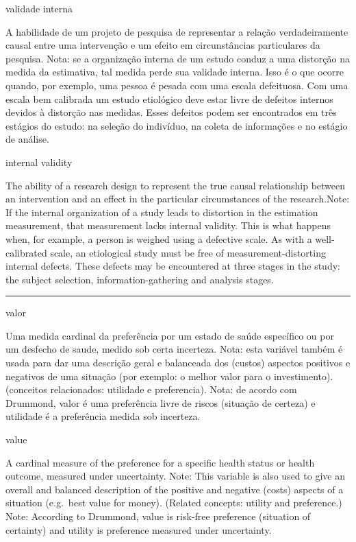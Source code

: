 \documentclass[
]{book}
\begin{document}
validade interna

A habilidade de um projeto de pesquisa de representar a relação verdadeiramente causal entre uma intervenção e um efeito em circunstâncias particulares da pesquisa. Nota: se a organização interna de um estudo conduz a uma distorção na medida da estimativa, tal medida perde sua validade interna. Isso é o que ocorre quando, por exemplo, uma pessoa é pesada com uma escala defeituosa. Com uma escala bem calibrada um estudo etiológico deve estar livre de defeitos internos devidos à distorção nas medidas. Esses defeitos podem ser encontrados em três estágios do estudo: na seleção do indivíduo, na coleta de informações e no estágio de análise.

internal validity

The ability of a research design to represent the true causal relationship between an intervention and an effect in the particular circumstances of the research.Note: If the internal organization of a study leads to distortion in the estimation measurement, that measurement lacks internal validity. This is what happens when, for example, a person is weighed using a defective scale. As with a well-calibrated scale, an etiological study must be free of measurement-distorting internal defects. These defects may be encountered at three stages in the study: the subject selection, information-gathering and analysis stages.

\begin{center}\rule{0.5\linewidth}{0.5pt}\end{center}

valor

Uma medida cardinal da preferência por um estado de saúde específico ou por um desfecho de saude, medido sob certa incerteza. Nota: esta variável também é usada para dar uma descrição geral e balanceada dos (custos) aspectos positivos e negativos de uma situação (por exemplo: o melhor valor para o investimento). (conceitos relacionados: utilidade e preferencia). Nota: de acordo com Drummond, valor é uma preferência livre de riscos (situação de certeza) e utilidade é a preferência medida sob incerteza.

value

A cardinal measure of the preference for a specific health status or health outcome, measured under uncertainty. Note: This variable is also used to give an overall and balanced description of the positive and negative (costs) aspects of a situation (e.g.~best value for money). (Related concepts: utility and preference.) Note: According to Drummond, value is risk-free preference (situation of certainty) and utility is preference measured under uncertainty.
\end{document}
